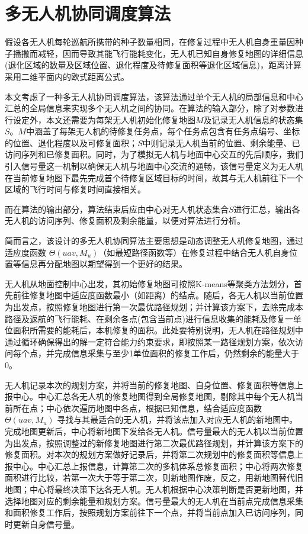 \documentclass[AutoFakeBold]{LZUThesis}
\begin{document}
\chapter{多无人机协同调度算法}

假设各无人机每轮巡航所携带的种子数量相同，在修复过程中无人机自身重量因种子播撒而减轻，因而导致其能飞行能耗变化，无人机已知自身修复地图的详细信息(退化区域的数量及区域位置、退化程度及待修复面积等退化区域信息)，距离计算采用二维平面内的欧式距离公式。

本文考虑了一种多无人机协同调度算法，该算法通过单个无人机的局部信息和中心汇总的全局信息来实现多个无人机之间的协同。在算法的输入部分，除了对参数进行设定外，本文还需要为每架无人机初始化修复地图$M$及记录无人机信息的状态集$S$。$M$中涵盖了每架无人机的待修复任务点，每个任务点包含有任务点编号、坐标的位置、退化程度以及可修复面积；$S$中则记录无人机当前的位置、剩余能量、已访问序列和已修复面积。同时，为了模拟无人机与地面中心交互的先后顺序，我们引入信号量这一机制以确保无人机与地面中心交流的通畅，该信号量定义为无人机在当前修复地图下最先完成首个待修复区域目标的时间，故其与无人机前往下一个区域的飞行时间与修复时间直接相关。

而在算法的输出部分，算法结束后应由中心对无人机状态集合$S$进行汇总，输出各无人机的访问序列、修复面积及剩余能量，以便对算法进行分析。

简而言之，该设计的多无人机协同算法主要思想是动态调整无人机修复地图，通过适应度函数 $\Theta(uav,M_u)$（如最短路径函数等）在修复过程中结合无人机自身位置等信息再分配地图以期望得到一个更好的结果。

无人机从地面控制中心出发，其初始修复地图可按照K-means等聚类方法划分，首先前往修复地图中适应度函数最小（如距离）的结点。随后，各无人机以当前位置为出发点，按照修复地图进行第一次最优路径规划；并计算该方案下，去除完成本路径及返航的飞行能耗、在剩余各点(包含当前点)进行信息收集的能耗及修复一单位面积所需要的能耗后，本机修复的面积。此处要特别说明，无人机在路径规划中通过循环确保得出的解一定符合能力约束要求，即按照某一路径规划方案，依次访问每个点，并完成信息采集与至少1单位面积的修复工作后，仍然剩余的能量大于0。

无人机记录本次的规划方案，并将当前的修复地图、自身位置、修复面积等信息上报中心。中心汇总各无人机的修复地图得到全局修复地图，剔除其中每个无人机当前所在点；中心依次遍历地图中各点，根据已知信息，结合适应度函数 $\Theta(uav,M_u)$ 寻找与其最适合的无人机，并将该点加入对应无人机的新地图中。完成地图更新后，中心将新地图下发给各无人机。信号量最大的无人机以当前位置为出发点，按照调整过的新修复地图进行第二次最优路径规划，并计算该方案下的修复面积。对本次的规划方案做好记录后，并将第二次规划中的修复面积等信息上报中心。中心汇总上报信息，计算第二次的多机体系总修复面积；中心将两次修复面积进行比较，若第一次大于等于第二次，则新地图作废，反之，用新地图替代旧地图；中心将最终决策下达各无人机。无人机根据中心决策判断是否更新地图，并选择地图对应的剩余能量和规划方案。信号量最大的无人机在当前点完成信息采集和面积修复工作后，按照规划方案前往下一个点，并将当前点加入已访问序列，同时更新自身信号量。
\end{document}
